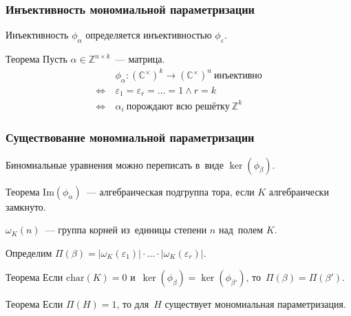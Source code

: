 \documentclass{beamer}
\newcommand{\Z}{\mathbb{Z}}
\begin{document}
\begin{frame}
  \frametitle{Инъективность мономиальной параметризации}

  Инъективность $\phi_\alpha$ определяется инъективностью $\phi_\varepsilon$.

  \begin{block}{Теорема}
    Пусть $\alpha \in \Z^{n \times k}$~— матрица.
    \begin{align*}
                     \ & \phi_\alpha : (\mathbb{C}^\times)^k \rightarrow (\mathbb{C}^\times)^n\ \text{инъективно} \\
      \Leftrightarrow\ & \varepsilon_1 = \varepsilon_r = \ldots = 1 \wedge r = k \\
      \Leftrightarrow\ & \alpha_i\ \text{порождают всю решётку}\ \Z^k
    \end{align*}
  \end{block}
\end{frame}

\begin{frame}
  \frametitle{Существование мономиальной параметризации}

  Биномиальные уравнения можно переписать в~виде $\ker(\phi_\beta)$.

  \begin{block}{Теорема}
    $\mathrm{Im}(\phi_\alpha)$~— алгебраическая подгруппа тора, если $K$ алгебраически замкнуто.
  \end{block}

  $\omega_K(n)$~— группа корней из~единицы степени $n$ над~полем $K$.

  Определим $\Pi(\beta) = |\omega_K(\varepsilon_1)| \cdot \ldots \cdot |\omega_K(\varepsilon_r)|$.

  \begin{block}{Теорема}
    Если $\mathrm{char}(K) = 0$ и~$\ker(\phi_{\beta}) = \ker(\phi_{\beta'})$, то~$\Pi(\beta) = \Pi(\beta')$.
  \end{block}

  \begin{block}{Теорема}
    Если $\Pi(H) = 1$, то для~$H$ существует мономиальная параметризация.
  \end{block}
\end{frame}
\end{document}
